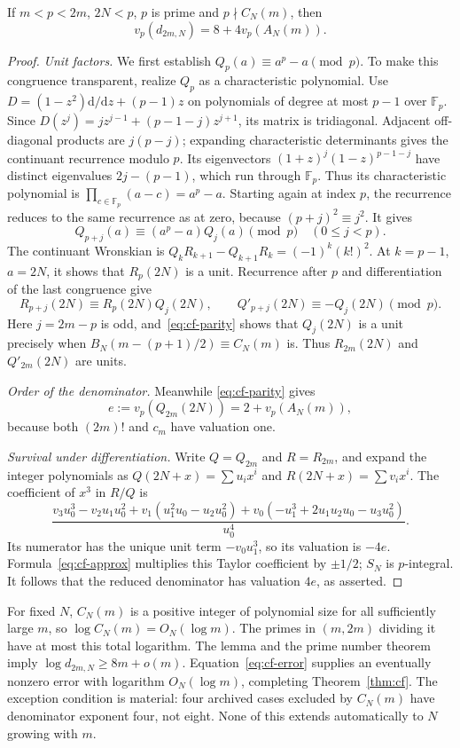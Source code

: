 \begin{lemma}\label{lem:cf-prime}
If $m<p<2m$, $2N<p$, $p$ is prime and $p\nmid C_N(m)$, then
\[
 v_p(d_{2m,N})=8+4v_p(A_N(m)).
\]
\end{lemma}
\begin{proof}
\emph{Unit factors.} We first establish
$Q_p(a)\equiv a^p-a\pmod p$. To make this congruence transparent,
realize $Q_p$ as a characteristic polynomial. Use
$D=(1-z^2)\mathrm d/\mathrm dz+(p-1)z$ on polynomials of degree
at most $p-1$ over $\mathbb F_p$. Since
$D(z^j)=jz^{j-1}+(p-1-j)z^{j+1}$, its matrix is tridiagonal.
Adjacent off-diagonal products are $j(p-j)$; expanding characteristic
determinants gives the continuant recurrence modulo $p$.
Its eigenvectors
$(1+z)^j(1-z)^{p-1-j}$ have distinct eigenvalues $2j-(p-1)$,
which run through $\mathbb F_p$. Thus its characteristic polynomial
is $\prod_{c\in\mathbb F_p}(a-c)=a^p-a$.
Starting again at index $p$, the recurrence reduces to the same
recurrence as at zero, because $(p+j)^2\equiv j^2$. It gives
\[
 Q_{p+j}(a)\equiv(a^p-a)Q_j(a)\pmod p\quad(0\leq j<p).
\]
The continuant Wronskian is
$Q_kR_{k+1}-Q_{k+1}R_k=(-1)^k(k!)^2$.
At $k=p-1$, $a=2N$, it shows that $R_p(2N)$ is a unit.
Recurrence after $p$ and differentiation of the last congruence give
\[
 R_{p+j}(2N)\equiv R_p(2N)Q_j(2N),\qquad
 Q'_{p+j}(2N)\equiv-Q_j(2N)\pmod p.
\]
Here $j=2m-p$ is odd, and~\eqref{eq:cf-parity} shows that $Q_j(2N)$
is a unit precisely when $B_N(m-(p+1)/2)\equiv C_N(m)$ is.
Thus $R_{2m}(2N)$ and $Q'_{2m}(2N)$ are units.

\emph{Order of the denominator.} Meanwhile
\eqref{eq:cf-parity} gives
\[
 e:=v_p(Q_{2m}(2N))=2+v_p(A_N(m)),
\]
because both $(2m)!$ and $c_m$ have valuation one.

\emph{Survival under differentiation.} Write $Q=Q_{2m}$ and
$R=R_{2m}$, and expand the integer polynomials as
$Q(2N+x)=\sum u_ix^i$ and
$R(2N+x)=\sum v_ix^i$. The coefficient of $x^3$ in $R/Q$ is
\[
 \frac{v_3u_0^3-v_2u_1u_0^2+
 v_1(u_1^2u_0-u_2u_0^2)+
 v_0(-u_1^3+2u_1u_2u_0-u_3u_0^2)}{u_0^4}.
\]
Its numerator has the unique unit term $-v_0u_1^3$, so its valuation
is $-4e$. Formula~\eqref{eq:cf-approx} multiplies this Taylor
coefficient by $\pm1/2$; $S_N$ is $p$-integral. It follows that the
reduced denominator has valuation $4e$, as asserted.
\end{proof}

For fixed $N$, $C_N(m)$ is a positive integer of polynomial size
for all sufficiently large $m$, so $\log C_N(m)=O_N(\log m)$.
The primes in $(m,2m)$ dividing it have at most this total logarithm.
The lemma and the prime number theorem imply
$\log d_{2m,N}\geq8m+o(m)$. Equation~\eqref{eq:cf-error} supplies
an eventually nonzero error with logarithm $O_N(\log m)$, completing
Theorem~\ref{thm:cf}. The exception condition is material: four
archived cases excluded by $C_N(m)$ have denominator exponent four,
not eight. None of this extends automatically to $N$ growing with $m$.

